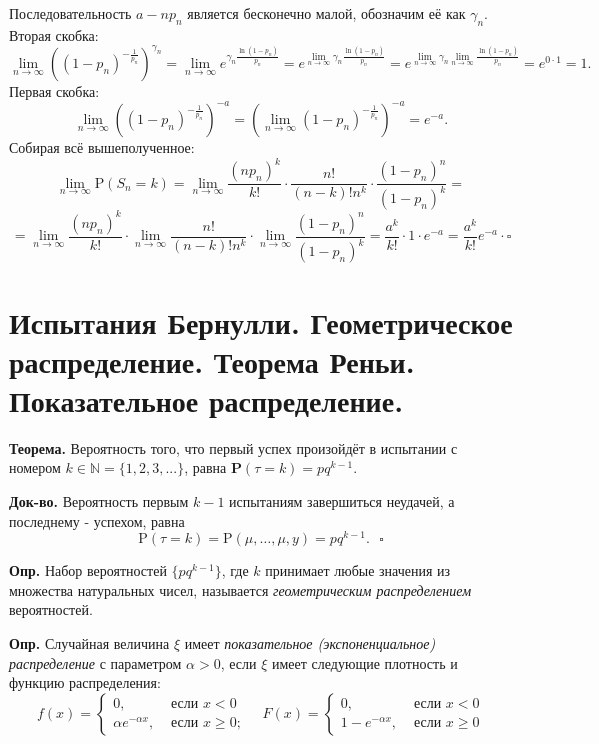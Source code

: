 \documentclass[oneside,final,14pt]{extreport}
\newcommand\mydef{{\bf Опр.}}
\newcommand\myth{{\bf Теорема.}}
\newcommand\myqed{{\bf Док-во.}}
\newcommand\myprob[1]{{\mathbf{P}(#1)}}
\theoremstyle{definition}
\begin{document}
Последовательность $a - np_n$ является бесконечно малой, обозначим её как $\gamma_n.$ Вторая скобка:
$$\lim _{n \rightarrow \infty}\left(\left(1-p_{n}\right)^{-\frac{1}{p_{n}}}\right)^{\gamma_{n}}=\lim _{n \rightarrow \infty} e^{\gamma_{n} \frac{\ln \left(1-p_{n}\right)}{p_{n}}}=e^{\lim\limits _{n \rightarrow \infty} \gamma_{n} \frac{\ln \left(1-p_{n}\right)}{p_{n}}}=e^{\lim\limits _{n \rightarrow \infty} \gamma_{n} \lim\limits_{n \rightarrow \infty} \frac{\ln \left(1-p_{n}\right)}{p_{n}}}=e^{0 \cdot 1}=1.$$
Первая скобка:
$$\lim _{n \rightarrow \infty}\left(\left(1-p_{n}\right)^{-\frac{1}{p_{n}}}\right)^{-a}=\left(\lim _{n \rightarrow \infty}\left(1-p_{n}\right)^{-\frac{1}{p_{n}}}\right)^{-a}=e^{-a}.$$
Собирая всё вышеполученное:
$$\lim _{n \rightarrow \infty} \mathrm{P}\left(S_{n}=k\right)=\lim _{n \rightarrow \infty} \frac{\left(n p_{n}\right)^{k}}{k !} \cdot \frac{n !}{(n-k) ! n^{k}} \cdot \frac{\left(1-p_{n}\right)^{n}}{\left(1-p_{n}\right)^{k}} = $$
$$=\lim _{n \rightarrow \infty} \frac{\left(n p_{n}\right)^{k}}{k !} \cdot \lim _{n \rightarrow \infty} \frac{n !}{(n-k) ! n^{k}} \cdot \lim _{n \rightarrow \infty} \frac{\left(1-p_{n}\right)^{n}}{\left(1-p_{n}\right)^{k}}=\frac{a^{k}}{k !} \cdot 1 \cdot e^{-a}=\frac{a^{k}}{k !} e^{-a} \cdot \square$$

\section {Испытания Бернулли. Геометрическое распределение. Теорема Реньи. Показательное распределение.}

\myth{} Вероятность того, что первый успех произойдёт в испытании с номером $k \in \mathbb{N} = \{1, 2, 3, ...\}$, равна $\myprob{\tau = k} = pq^{k-1}$.

\myqed{} Вероятность первым $k - 1$ испытаниям завершиться неудачей, а последнему - успехом, равна 
$$\mathrm{P}(\tau=k)=\mathrm{P}(\mu, \ldots, \mu, y)=p q^{k-1}. ~~~ \square$$

\mydef{} Набор вероятностей $\{p q^{k-1}\}$, где $k$ принимает любые значения из множества натуральных чисел, называется {\it геометрическим распределением} вероятностей. 

\mydef{} Случайная величина $\xi$ имеет {\it показательное (экспоненциальное) распределение} с параметром $\alpha > 0$, если $\xi$ имеет следующие плотность и функцию распределения:
$$f(x)=\left\{\begin{array}{cc}
0, & \text { если } x<0 \\
\alpha e^{-\alpha x}, & \text { если } x \geqslant 0 ;
\end{array} \quad F(x)=\left\{\begin{array}{cc}
0, & \text { если } x<0 \\
1-e^{-\alpha x}, & \text { если } x \geqslant 0
\end{array}\right.\right.$$
\end{document}
